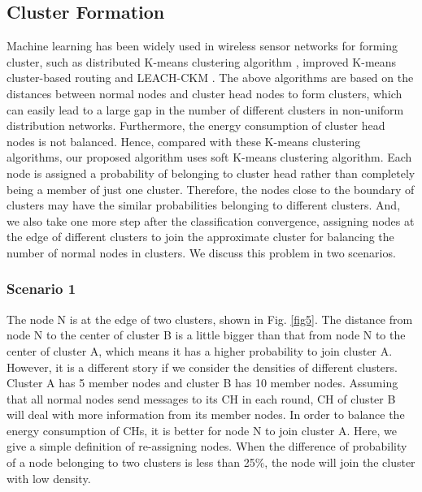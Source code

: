\documentclass[journal,twoside,web]{ieeecolor}
\begin{document}
\subsection{Cluster Formation}
Machine learning has been widely used in wireless sensor networks for forming cluster, such as distributed K-means clustering algorithm \cite{b19}, improved K-means cluster-based routing\cite{b20} and LEACH-CKM \cite{b21}. The above algorithms are based on the distances between normal nodes and cluster head nodes to form clusters, which can easily lead to a large gap in the number of different clusters in non-uniform distribution networks. Furthermore, the energy consumption of cluster head nodes is not balanced. Hence, compared with these K-means clustering algorithms, our proposed algorithm uses soft K-means clustering algorithm. Each node is assigned a probability of belonging to cluster head rather than completely being a member of just one cluster. Therefore, the nodes close to the boundary of clusters may have the similar probabilities belonging to different clusters. And, we also take one more step after the classification convergence, assigning nodes at the edge of different clusters to join the approximate cluster for balancing the number of normal nodes in clusters. We discuss this problem in two scenarios.

\subsubsection{Scenario 1}
The node N is at the edge of two clusters, shown in Fig. \ref{fig5}. The distance from node N to the center of cluster B is a little bigger than that from node N to the center of cluster A, which means it has a higher probability to join cluster A. However, it is a different story if we consider the densities of different clusters. Cluster A has 5 member nodes and cluster B has 10 member nodes. Assuming that all normal nodes send messages to its CH in each round, CH of cluster B will deal with more information from its member nodes. In order to balance the energy consumption of CHs, it is better for node N to join cluster A. Here, we give a simple definition of re-assigning nodes. When the difference of probability of a node belonging to two clusters is less than 25$\%$, the node will join the cluster with low density.
\end{document}
